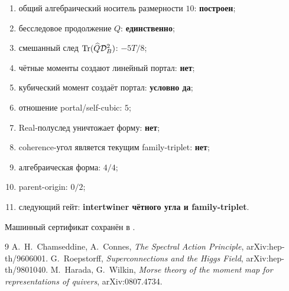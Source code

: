 \begin{protocol}\begin{enumerate}
\item общий алгебраический носитель размерности $10$: \textbf{построен};
\item бесследовое продолжение $Q$: \textbf{единственно};
\item смешанный след $\operatorname{Tr}(\widehat Q\mathcal D_B^2)$:
\textbf{$-5T/8$};
\item чётные моменты создают линейный портал: \textbf{нет};
\item кубический момент создаёт портал: \textbf{условно да};
\item отношение portal/self-cubic: \textbf{$5$};
\item Real-полуслед уничтожает форму: \textbf{нет};
\item coherence-угол является текущим family-triplet: \textbf{нет};
\item алгебраическая форма: \textbf{$4/4$};
\item parent-origin: \textbf{$0/2$};
\item следующий гейт: \textbf{intertwiner чётного угла и family-triplet}.
\end{enumerate}\end{protocol}

Машинный сертификат сохранён в
.

\begin{thebibliography}{9}
A.~H.~Chamseddine, A.~Connes,
\emph{The Spectral Action Principle}, arXiv:hep-th/9606001.
G.~Roepstorff,
\emph{Superconnections and the Higgs Field}, arXiv:hep-th/9801040.
M.~Harada, G.~Wilkin,
\emph{Morse theory of the moment map for representations of quivers},
arXiv:0807.4734.
\end{thebibliography}